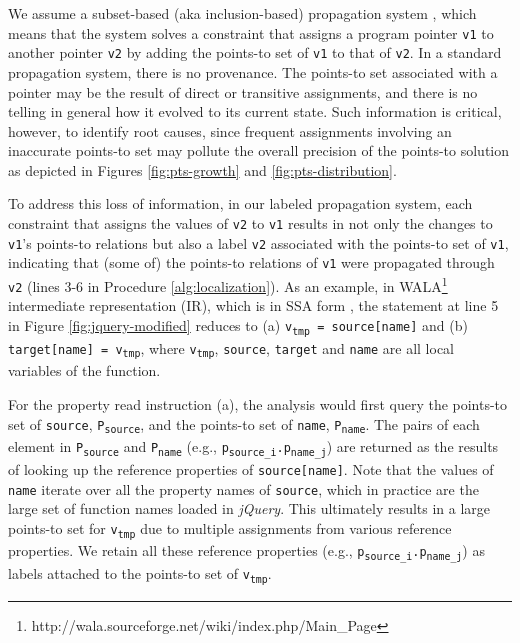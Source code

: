 We assume a subset-based (aka inclusion-based) propagation system \cite{andersen1994program}, which means that the system solves a constraint that assigns a program pointer {\tt v1} to another pointer {\tt v2} by adding the points-to set of {\tt v1} to that of {\tt v2}. In a standard propagation system, there is no provenance. The points-to set associated with a pointer may be the result of direct or transitive assignments, and there is no telling in general how it evolved to its current state. Such information is critical, however, to identify root causes, since frequent assignments involving an inaccurate points-to set may pollute the overall precision of the points-to solution as depicted in Figures \ref{fig:pts-growth} and \ref{fig:pts-distribution}.

To address this loss of information, in our labeled propagation system, each constraint that assigns the values of {\tt v2} to {\tt v1} results in not only the changes to {\tt v1}'s points-to relations but also a label {\tt v2} associated with the points-to set of {\tt v1}, indicating that (some of) the points-to relations of {\tt v1} were propagated through {\tt v2} (lines 3-6 in Procedure \ref{alg:localization}). As an example, in WALA\footnote{http://wala.sourceforge.net/wiki/index.php/Main\_Page} intermediate representation (IR), which is in SSA form \cite{Cytron:1991:ECS:115372.115320}, the statement at line 5 in Figure \ref{fig:jquery-modified} reduces to (a) {\tt v\textsubscript{tmp} = source[name]} and (b) {\tt target[name] = v\textsubscript{tmp}}, where {\tt v\textsubscript{tmp}}, {\tt source}, {\tt target} and {\tt name} are all local variables of the function.  

For the property read instruction (a), the analysis would first query the points-to set of {\tt source}, {\tt P\textsubscript{source}}, and the points-to set of {\tt name}, {\tt P\textsubscript{name}}. The pairs of each element in {\tt P\textsubscript{source}} and {\tt P\textsubscript{name}} (e.g., {\tt p\textsubscript{source\_i}.p\textsubscript{name\_j}}) are returned as the results of looking up the reference properties of {\tt source[name]}. Note that the values of {\tt name} iterate over all the property names of {\tt source}, which in practice are the large set of function names loaded in {\it jQuery}. This ultimately results in a large points-to set for {\tt v\textsubscript{tmp}} due to multiple assignments from various reference properties. We retain all these reference properties (e.g., {\tt p\textsubscript{source\_i}.p\textsubscript{name\_j}}) as labels attached to the points-to set of {\tt v\textsubscript{tmp}}. 

